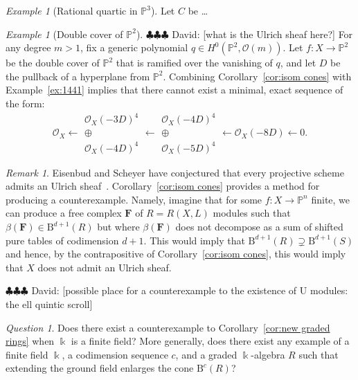 \documentclass[12pt]{amsart}
\theoremstyle{definition}
\theoremstyle{remark}
\newtheorem{example}[lemma]{Example}
\newtheorem{remark}[lemma]{Remark}
\newtheorem{question}[lemma]{Question}
\newcommand{\kk}{\Bbbk}
\newcommand{\PP}{\mathbb{P}}
\newcommand{\cc}{c}
\newcommand{\cO}{\mathcal{O}}
\newcommand{\FF}{\mathbf{F}}
\newcommand{\BBQ}{\mathrm{B}}
\newcommand{\david}[1]{{\color{red} \sf $\clubsuit\clubsuit\clubsuit$ David: [#1]}}
\begin{document}
\begin{example}[Rational quartic in $\PP^3$]
Let $C$ be \dots
\end{example}




\begin{example}[Double cover of $\PP^2$] \david{what is the Ulrich sheaf here?}
For any degree $m>1$, fix a generic polynomial $q\in H^0(\PP^2, \cO(m))$.  Let $f\colon X\to\PP^2$ be the double cover of $\PP^2$ that is ramified over the vanishing of $q$, and let $D$ be the pullback of a hyperplane from $\PP^2$.  Combining Corollary~\ref{cor:isom cones} with Example~\ref{ex:1441} implies that there cannot exist a minimal, exact sequence of the form:
\[
\cO_X\longleftarrow \begin{matrix}  \cO_X(-3D)^4\\ \oplus\\ \cO_X(-4D)^4\end{matrix}\longleftarrow \begin{matrix}  \cO_X(-4D)^4\\ \oplus\\ \cO_X(-5D)^4\end{matrix} \longleftarrow \cO_X(-8D)\longleftarrow 0.
\]
\end{example}


\begin{remark}
Eisenbud and Scheyer have conjectured that every projective scheme admits an Ulrich sheaf~\cite[p. 543]{eis-schrey-chow}.  Corollary~\ref{cor:isom cones} provides a method for producing a counterexample.  Namely, imagine that for some $f\colon X\to \PP^n$ finite, we can produce a free complex $\FF$ of $R=R(X,L)$ modules such that $\beta(\FF)\in \BBQ^{d+1}(R)$ but where $\beta(\FF)$ does not decompose as a sum of shifted pure tables of codimension $d+1$.  This would imply that $\BBQ^{d+1}(R)\supsetneq \BBQ^{d+1}(S)$ and hence, by the contrapositive of Corollary~\ref{cor:isom cones}, this would imply that $X$ does not admit an Ulrich sheaf.
\end{remark}

\david{possible place for a counterexample to the existence of U modules: the ell quintic scroll}

\begin{question}
Does there exist a counterexample to Corollary~\ref{cor:new graded rings} when $\kk$ is a finite field?  
More generally, does there exist any example of a finite field $\kk$, a codimension sequence $\cc$, and a graded $\kk$-algebra $R$ such that extending the ground field enlarges the cone $\BBQ^{\cc}(R)$?
\end{question}
\end{document}
